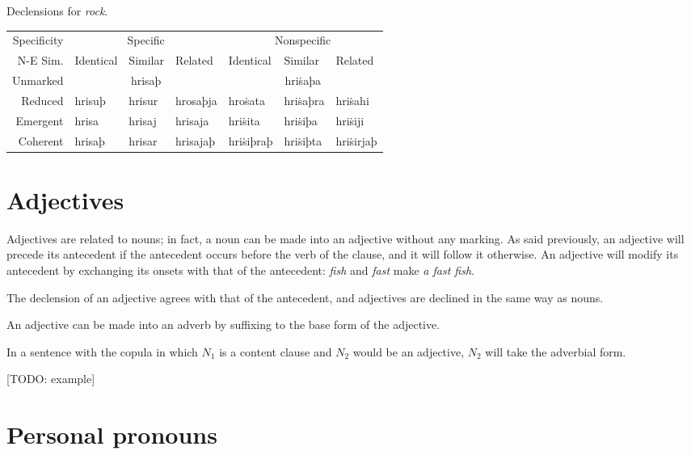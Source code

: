 \documentclass{book}
\begin{document}
\begin{tablenf}
  \caption{Declensions for  \emph{rock}. \label{table:declensionex1}}
  \centering
  \begin{tabular}{r|lll|lll}
    Specificity & \multicolumn{3}{c|}{Specific} & \multicolumn{3}{c}{Nonspecific} \\
    N-E \bs{} Sim. & Identical & Similar & Related & Identical & Similar & Related \\
    \hline
    Unmarked & \multicolumn{3}{c|}{hrisaþ} & \multicolumn{3}{c}{hriṡaþa} \\
    Reduced & hrisuþ & hrisur & hrosaþja & hroṡata & hriṡaþra & hriṡahi \\
    Emergent & hrisa & hrisaj & hrisaja & hriṡita & hriṡiþa & hriṡiji \\
    Coherent & hrisaþ & hrisar & hrisajaþ & hriṡiþraþ & hriṡiþta & hriṡirjaþ \\
  \end{tabular}
\end{tablenf}

\section{Adjectives}

Adjectives are related to nouns; in fact, a noun can be made into an adjective without any marking. As said previously, an adjective will precede its antecedent if the antecedent occurs before the verb of the clause, and it will follow it otherwise. An adjective will modify its antecedent by exchanging its onsets with that of the antecedent:  \emph{fish} and  \emph{fast} make  \emph{a fast fish}.

The declension of an adjective agrees with that of the antecedent, and adjectives are declined in the same way as nouns.

An adjective can be made into an adverb by suffixing  to the base form of the adjective.

In a sentence with the copula in which $N_1$ is a content clause and $N_2$ would be an adjective, $N_2$ will take the adverbial form.

{}[TODO: example]

\section{Personal pronouns}
\end{document}
